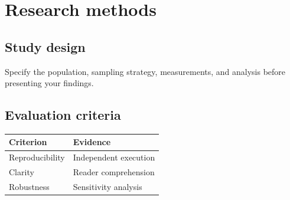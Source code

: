 \chapter{Research methods}\label{ch:methods}
\section{Study design}
Specify the population, sampling strategy, measurements, and analysis before presenting your findings.
\lipsum[3-4]
\section{Evaluation criteria}
\begin{tabular}{ll}\toprule Criterion & Evidence\\\midrule Reproducibility & Independent execution\\Clarity & Reader comprehension\\Robustness & Sensitivity analysis\\\bottomrule\end{tabular}
